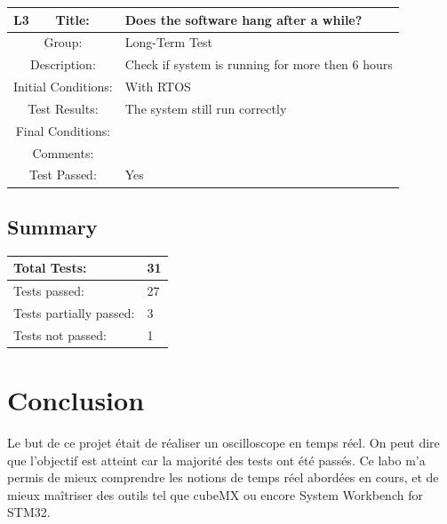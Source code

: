 \documentclass[12pt]{article}
\begin{document}
		\begin{table}[H]
	\begin{center}
		\begin{tabular}{| m{2cm}|m{2cm}|m{12cm}|}
			\hline 
			\bf L3&\bf Title:&\bf Does the software hang after a while?\\
			\hline 
			\multicolumn{2}{|c|}{Group:}&Long-Term Test\\ 
			\hline 
			\multicolumn{2}{|c|}{Description:}&Check if system is running for more then 6 hours\\ 
			\hline 
			\multicolumn{2}{|c|}{Initial Conditions:}&With RTOS\\ 
			\hline 
			\multicolumn{2}{|c|}{Test Results:}&The system still run correctly\\ 
			\hline 
			\multicolumn{2}{|c|}{Final Conditions:}&\\ 
			\hline 
			\multicolumn{2}{|c|}{Comments:}&\\ 
			\hline 
			\multicolumn{2}{|c|}{Test Passed:}&Yes \\ 
			\hline 
		\end{tabular} 
	\end{center}
\end{table}	

\subsection{Summary}

			\begin{table}[H]
		\begin{center}
			\begin{tabular}{| m{6cm}|m{2cm}|}
				\hline 
				\bf Total Tests:&\bf 31\\
				\hline 
				Tests passed:&27\\ 
				\hline 
				Tests partially passed:&3\\ 
				\hline 
				Tests not passed:&1\\ 
				\hline 
			\end{tabular} 
		\end{center}
	\end{table}	

	\section{Conclusion}
	Le but de ce projet était de réaliser un oscilloscope en temps réel. On peut dire que l'objectif est atteint car la majorité des tests ont été passés. Ce labo m'a permis de mieux comprendre les notions de temps réel abordées en cours, et de mieux maîtriser des outils tel que cubeMX ou encore System Workbench for STM32.
\end{document}
